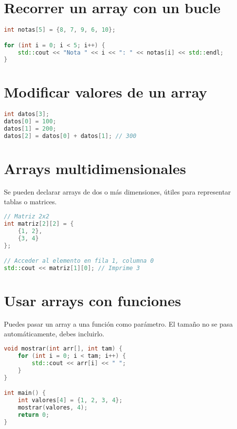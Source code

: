 \documentclass[a4paper]{article}
\begin{document}
\section{Recorrer un array con un bucle}

\begin{lstlisting}[language=C++]
int notas[5] = {8, 7, 9, 6, 10};

for (int i = 0; i < 5; i++) {
    std::cout << "Nota " << i << ": " << notas[i] << std::endl;
}
\end{lstlisting}

\section{Modificar valores de un array}

\begin{lstlisting}[language=C++]
int datos[3];
datos[0] = 100;
datos[1] = 200;
datos[2] = datos[0] + datos[1]; // 300
\end{lstlisting}

\section{Arrays multidimensionales}

Se pueden declarar arrays de dos o más dimensiones, útiles para representar tablas o matrices.

\begin{lstlisting}[language=C++]
// Matriz 2x2
int matriz[2][2] = {
    {1, 2},
    {3, 4}
};

// Acceder al elemento en fila 1, columna 0
std::cout << matriz[1][0]; // Imprime 3
\end{lstlisting}

\section{Usar arrays con funciones}

Puedes pasar un array a una función como parámetro. El tamaño no se pasa automáticamente, debes incluirlo.

\begin{lstlisting}[language=C++]
void mostrar(int arr[], int tam) {
    for (int i = 0; i < tam; i++) {
        std::cout << arr[i] << " ";
    }
}

int main() {
    int valores[4] = {1, 2, 3, 4};
    mostrar(valores, 4);
    return 0;
}
\end{lstlisting}
\end{document}
